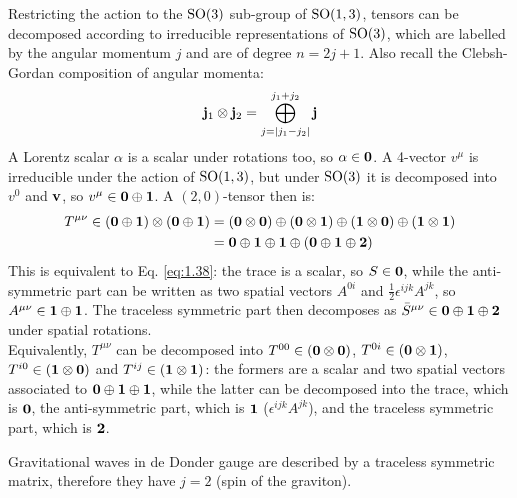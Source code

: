 Restricting the action to the $ \mathrm{SO}(3) $ sub-group of $ \mathrm{SO}(1,3) $, tensors can be decomposed according to irreducible representations of $ \mathrm{SO}(3) $, which are labelled by the angular momentum $ j $ and are of degree $ n = 2j + 1 $. Also recall the Clebsh-Gordan composition of angular momenta:
\begin{equation}
  \mathbf{j}_1 \otimes \mathbf{j}_2 = \bigoplus_{j = \left\lvert j_1 - j_2\right\rvert}^{j_1 + j_2} \mathbf{j}
  \label{eq:1.39}
\end{equation}
A Lorentz scalar $ \alpha $ is a scalar under rotations too, so $ \alpha \in \mathbf{0} $. A 4-vector $ v^\mu $ is irreducible under the action of $ \mathrm{SO}(1,3) $, but under $ \mathrm{SO}(3) $ it is decomposed into $ v^0 $ and $ \mathbf{v} $, so $ v^\mu \in \mathbf{0} \oplus \mathbf{1} $. A $ (2,0) $-tensor then is:
\begin{equation*}
  \begin{split}
    T^{\mu \nu} \in \left( \mathbf{0} \oplus \mathbf{1} \right) \otimes \left( \mathbf{0} \oplus \mathbf{1} \right)
    &= \left( \mathbf{0} \otimes \mathbf{0} \right) \oplus \left( \mathbf{0} \otimes \mathbf{1} \right) \oplus \left( \mathbf{1} \otimes \mathbf{0} \right) \oplus \left( \mathbf{1} \otimes \mathbf{1} \right) \\
    &= \mathbf{0} \oplus \mathbf{1} \oplus \mathbf{1} \oplus \left( \mathbf{0} \oplus \mathbf{1} \oplus \mathbf{2} \right)
  \end{split}
\end{equation*}
This is equivalent to Eq. \ref{eq:1.38}: the trace is a scalar, so $ S \in \mathbf{0} $, while the anti-symmetric part can be written as two spatial vectors $ A^{0i} $ and $ \frac{1}{2} \epsilon^{ijk} A^{jk} $, so $ A^{\mu \nu} \in \mathbf{1} \oplus \mathbf{1} $. The traceless symmetric part then decomposes as $ \bar{S}^{\mu \nu} \in \mathbf{0} \oplus \mathbf{1} \oplus \mathbf{2} $ under spatial rotations.\\
Equivalently, $ T^{\mu \nu} $ can be decomposed into $ T^{00} \in \left( \mathbf{0} \otimes \mathbf{0} \right) $, $ T^{0i} \in \left( \mathbf{0} \otimes \mathbf{1} \right) $, $ T^{i0} \in \left( \mathbf{1} \otimes \mathbf{0} \right) $ and $ T^{ij} \in \left( \mathbf{1} \otimes \mathbf{1} \right) $: the formers are a scalar and two spatial vectors associated to $ \mathbf{0} \oplus \mathbf{1} \oplus \mathbf{1} $, while the latter can be decomposed into the trace, which is $ \mathbf{0} $, the anti-symmetric part, which is $ \mathbf{1} $ ($ \epsilon^{ijk} A^{jk} $), and the traceless symmetric part, which is $ \mathbf{2} $.

\begin{example}
  Gravitational waves in de Donder gauge are described by a traceless symmetric matrix, therefore they have $ j = 2 $ (spin of the graviton).
\end{example}


